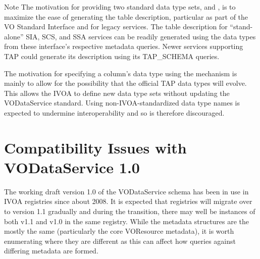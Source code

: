 \documentclass[11pt,a4paper]{ivoa}
\begin{document}
\begin{admonition}{Note}
The motivation for providing two standard data type sets,
        and , is to maximize
       the ease of generating the table description, particular as
       part of the VO Standard Interface \citep{VOSI}
       and for legacy services.  The table description for
       ``stand-alone'' SIA, SCS, and SSA services can be readily
       generated using the  data types from
       these interface's respective metadata queries.  Newer services
       supporting TAP could generate its description using its
       TAP\_SCHEMA queries.

       
       The motivation for specifying a column's data type using the
        mechanism is mainly to allow for the
       possibility that the official TAP data types will evolve.  This
       allows the IVOA to define new data type sets without updating
       the VODataService standard.  Using non-IVOA-standardized data
       type names is expected to undermine interoperability and so is
       therefore discouraged.  
\end{admonition}

\appendix

\section{Compatibility Issues with VODataService 1.0}
\label{vods10-compat}

The working draft version 1.0 of the VODataService schema has been in
use in IVOA registries since about 2008.  It is expected that
registries will migrate over to version 1.1 gradually and during the
transition, there may well be instances of both v1.1 and v1.0 in the
same registry.  While the metadata structures are the mostly the same
(particularly the core VOResource metadata), it is worth enumerating
where they are different as this can affect how queries against
differing metadata are formed.
\end{document}
